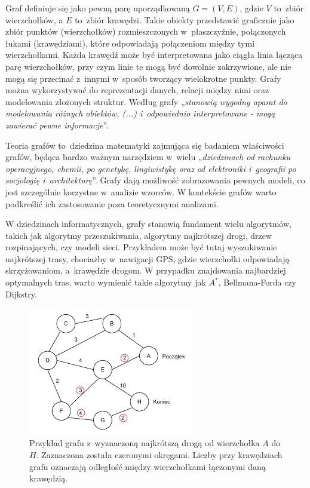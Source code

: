 Graf definiuje się jako pewną parę uporządkowaną $G = (V, E)$, gdzie $V$ to~zbiór wierzchołków,
a $E$ to~zbiór krawędzi.
Takie obiekty przedstawić graficznie jako zbiór punktów (wierzchołków) rozmieszczonych w~płaszczyźnie,
połączonych łukami (krawędziami), które odpowiadają połączeniom między tymi wierzchołkami.
Każda krawędź może być interpretowana jako ciągła linia łącząca parę wierzchołków,
przy czym linie te mogą być dowolnie zakrzywione,
ale nie mogą się przecinać z~innymi w~sposób tworzący wielokrotne punkty.
Grafy można wykorzystywać do reprezentacji danych, relacji między nimi oraz modelowania złożonych struktur.
Według \cite{Wloch2008} grafy „\textit{stanowią wygodny aparat do modelowania różnych obiektów, (...) i~odpowiednio interpretowane
- mogą zawierać pewne informacje}”.

Teoria grafów to~dziedzina matematyki zajmująca się badaniem właściwości grafów,
będąca bardzo ważnym narzędziem w~wielu „\textit{dziedzinach od rachunku operacyjnego, chemii, po genetykę, lingiwistykę
oraz od elektroniki i~geografii po socjologię i~architekturę}”\cite{Wilson2012}.
Grafy dają możliwość zobrazowania pewnych modeli, co jest szczególnie korzystne w~analizie wzorców.
W kontekście grafów warto podkreślić ich zastosowanie poza teoretycznymi analizami.

W dziedzinach informatycznych, grafy stanowią fundament wielu algorytmów, takich jak algorytmy przeszukiwania,
algorytmy najkrótszej drogi, drzew rozpinających, czy modeli sieci.
Przykładem może być tutaj wyszukiwanie najkrótszej trasy, chociażby w~nawigacji GPS,
gdzie wierzchołki odpowiadają skrzyżowaniom, a~krawędzie drogom.
W przypadku znajdowania najbardziej optymalnych tras, warto wymienić takie algorytmy jak $A^*$, Bellmana-Forda czy Dijkstry.

\begin{figure}[ht]
	\centering
	\includegraphics[height=5.6cm]{resources/introduction/images/shortest_path.png}
	\caption{Przykład grafu z~wyznaczoną najkrótszą drogą od wierzchołka $A$ do $H$.
		Zaznaczona została czeronymi okręgami.
		Liczby przy krawędziach grafu oznaczają odległość między wierzchołkami łączonymi daną krawędzią.}
    \label{Fig:intro-1}
\end{figure}
\FloatBarrier

